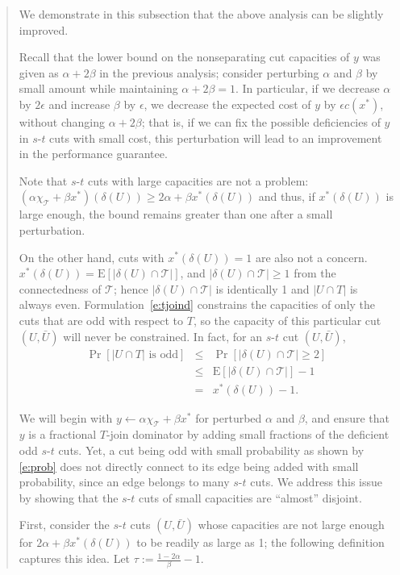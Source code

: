 \documentclass[11pt,letterpaper]{article}
\newcommand{\E}{\mathrm{E}}
\newcommand{\st}{\mbox{$s$-$t$} }
\begin{document}
\begin{quote}
We demonstrate in this subsection that the above analysis can be slightly improved.

Recall that the lower bound on the nonseparating cut capacities of $y$ was given as $\alpha+2\beta$ in the previous analysis; consider perturbing $\alpha$ and $\beta$ by small amount while maintaining $\alpha+2\beta =1$. In particular, if we decrease $\alpha$ by $2\epsilon$ and increase $\beta$ by $\epsilon$, we decrease the expected cost of $y$ by $\epsilon c(x^*)$, without changing $\alpha+2\beta$; that is, if we can fix the possible deficiencies of $y$ in \st cuts with small cost, this perturbation will lead to an improvement in the performance guarantee.

Note that \st cuts with large capacities are not a problem: $(\alpha\chi_{\mathscr{T}}+\beta x^*)(\delta(U))\geq 2\alpha+\beta x^*(\delta(U))$ and thus, if $x^*(\delta(U))$ is large enough, the bound remains greater than one after a small perturbation.

On the other hand, cuts with $x^*(\delta(U))=1$ are also not a concern. $x^*(\delta(U))=\E[|\delta(U)\cap\mathscr{T}|]$, and $|\delta(U)\cap\mathscr{T}|\geq 1$ from the connectedness of $\mathscr{T}$; hence $|\delta(U)\cap\mathscr{T}|$ is identically 1 and $|U\cap T|$ is always even. Formulation~\eqref{e:tjoind} constrains the capacities of only the cuts that are odd with respect to $T$, so the capacity of this particular cut $(U,\bar U)$ will never be constrained. In fact, for an \st cut $(U,\bar U)$, \begin{eqnarray}
\Pr[|U \cap T|\textrm{ is odd}] &\leq& \Pr[|\delta(U)\cap \mathscr{T}|\geq 2]\nonumber\\
&\leq& \E[|\delta(U)\cap \mathscr{T}|] - 1\nonumber\\
&=& x^*(\delta(U))-1\label{e:prob}
.\end{eqnarray}

We will begin with $y\gets \alpha\chi_{\mathscr{T}}+\beta x^*$ for perturbed $\alpha$ and $\beta$, and ensure that $y$ is a fractional $T$-join dominator by adding small fractions of the deficient odd \st cuts. Yet, a cut being odd with small probability as shown by \eqref{e:prob} does not directly connect to its edge being added with small probability, since an edge belongs to many \st cuts. We address this issue by showing that the \st cuts of small capacities are ``almost'' disjoint.

First, consider the \st cuts $(U,\bar U)$ whose capacities are not large enough for $2\alpha+\beta x^*(\delta(U))$ to be readily as large as 1; the following definition captures this idea. Let $\tau:=\frac{1-2\alpha}{\beta}-1$.


\end{quote}
\end{document}
